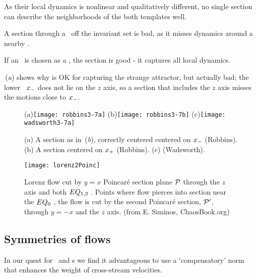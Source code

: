  As their local
dynamics is nonlinear and qualitatively different, no single section can
describe the neighborhoods of the both templates well.

A section through a \template\ off the invariant set is bad, as it misses
dynamics around a nearby \eqv.

If an \eqv\ is chosen as a \template, the section is good - it captures
all local dynamics.

\,({\it a}) shows why  is OK for
capturing the strange attractor, but actually bad; the lower \eqv\
$x_{-}$ does not lie on the $z$ axis, so a section that includes the
$z$ axis misses the motions close to  $x_{-}$.

\begin{figure}
   \centering
(a)\texttt{[image: robbins3-7a]}
(b)\texttt{[image: robbins3-7b]}
(c)\texttt{[image: wadsworth3-7a]}
   \caption{\label{fig:robbins3-7}
    (a)
A section as in \,({\it b}), correctly centered
centered on $x_{-}$ (Robbins).
    (b)
A section centered on $x_{+}$ (Robbins).
    (c)
(Wadsworth).
}
\end{figure}

\begin{figure}
   \centering
\texttt{[image: lorenz2Poinc]}
   \caption{
Lorenz flow cut by  $y=x$ Poincar\'e section plane ${\cal P}$ through the
$z$ axis and both $EQ_{1,2}$ \eqva. Points where flow pierces into
section %
near the $EQ_{0}$ \eqv, the flow is cut by the second Poincar\'e
section,  ${\cal P}'$, through $y=-x$ and the $z$ axis.
\hfill (from E. Siminos, ChaosBook.org)
} \label{fig:LorenzSect}
\end{figure}


\subsection{Symmetries of flows}
\label{s:symmFL}

In our quest for \reqva\ and \rpo s we
find it advantageous to use a `compensatory' norm %
that enhances the weight of cross-stream velocities.


